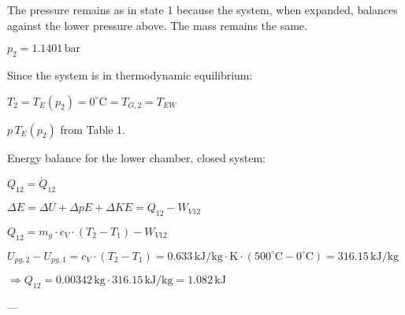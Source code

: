 The pressure remains as in state 1 because the system, when expanded, balances against the lower pressure above. The mass remains the same.  

\( p_2 = 1.1401 \, \text{bar} \)  

Since the system is in thermodynamic equilibrium:  

\( T_2 = T_E(p_2) = 0^\circ \text{C} = T_{G,2} = T_{EW} \)  

\( p \, T_E(p_2) \) from Table 1.

Energy balance for the lower chamber, closed system:  

\( Q_{12} = \dot{Q}_{12} \)  

\( \Delta E = \Delta U + \Delta pE + \Delta KE = Q_{12} - W_{V12} \)  

\( Q_{12} = m_g \cdot c_V \cdot (T_2 - T_1) - W_{V12} \)  

\( U_{pg,2} - U_{pg,1} = c_V \cdot (T_2 - T_1) = 0.633 \, \text{kJ/kg} \cdot \text{K} \cdot (500^\circ \text{C} - 0^\circ \text{C}) = 316.15 \, \text{kJ/kg} \)  

\( \Rightarrow Q_{12} = 0.00342 \, \text{kg} \cdot 316.15 \, \text{kJ/kg} = 1.082 \, \text{kJ} \)  

---